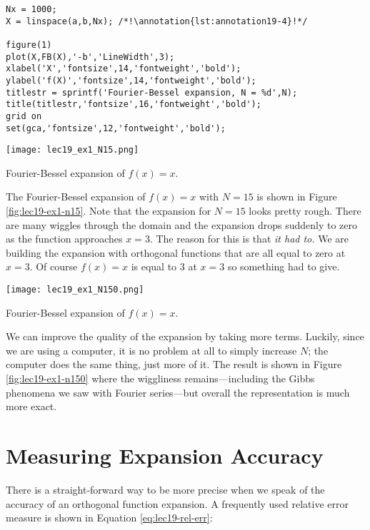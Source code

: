 \begin{lstlisting}[name=lec19_ex,style=myMatlab]
Nx = 1000;
X = linspace(a,b,Nx); /*!\annotation{lst:annotation19-4}!*/

figure(1)
plot(X,FB(X),'-b','LineWidth',3);
xlabel('X','fontsize',14,'fontweight','bold');
ylabel('f(X)','fontsize',14,'fontweight','bold');
titlestr = sprintf('Fourier-Bessel expansion, N = %d',N);
title(titlestr,'fontsize',16,'fontweight','bold');
grid on
set(gca,'fontsize',12,'fontweight','bold');

\end{lstlisting}
\begin{marginfigure}
\texttt{[image: lec19\_ex1\_N15.png]}
\caption{Fourier-Bessel expansion of $f(x)=x$.}
\label{fig:lec19-ex1-n15}
\end{marginfigure}
The Fourier-Bessel expansion of $f(x)=x$ with $N=15$ is shown in Figure \ref{fig:lec19-ex1-n15}.  Note that the expansion for $N=15$ looks pretty rough. There are many wiggles through the domain and the expansion drops suddenly to zero as the function approaches $x=3$.  The reason for this is that \emph{it had to.}  We are building the expansion with orthogonal functions that are all equal to zero at $x=3$.  Of course $f(x)=x$ is equal to 3 at $x=3$ so something had to give.  

\begin{marginfigure}
\texttt{[image: lec19\_ex1\_N150.png]}
\caption{Fourier-Bessel expansion of $f(x)=x$.}
\label{fig:lec19-ex1-n150}
\end{marginfigure}
We can improve the quality of the expansion by taking more terms.  Luckily, since we are using a computer, it is no problem at all to simply increase $N$; the computer does the same thing, just more of it.  The result is shown in Figure \ref{fig:lec19-ex1-n150} where the wiggliness remains---including the Gibbs phenomena we saw with Fourier series---but overall the representation is much more exact.

\section{Measuring Expansion Accuracy}
There is a straight-forward way to be more precise when we speak of the accuracy of an orthogonal function expansion.  A frequently used relative error measure is shown in Equation \ref{eq:lec19-rel-err}:


